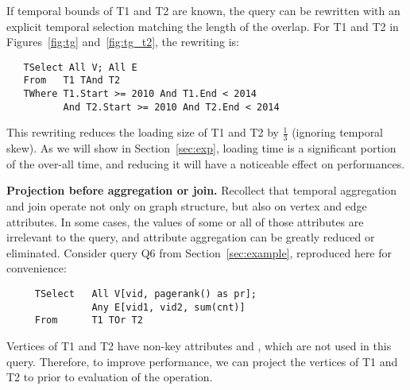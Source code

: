 If temporal bounds of T1 and T2 are known, the query can be rewritten
with an explicit temporal selection matching the length of the
overlap.  For T1 and T2 in Figures~\ref{fig:tg} and~\ref{fig:tg_t2},
the rewriting is:

\begin{small}
\begin{verbatim}
   TSelect All V; All E
   From   T1 TAnd T2
   TWhere T1.Start >= 2010 And T1.End < 2014 
          And T2.Start >= 2010 And T2.End < 2014
\end{verbatim}
\end{small}

This rewriting reduces the loading size of T1 and T2 by $\frac{1}{3}$
(ignoring temporal skew).  As we will show in Section~\ref{sec:exp},
loading time is a significant portion of the over-all time, and
reducing it will have a noticeable effect on performances.

{\bf Projection before aggregation or join.}  Recollect that temporal
aggregation and join operate not only on graph structure, but also on
vertex and edge attributes.  In some cases, the values of some or all
of those attributes are irrelevant to the query, and attribute
aggregation can be greatly reduced or eliminated.  Consider query Q6
from Section~\ref{sec:example}, reproduced here for convenience:

\begin{small}
\begin{verbatim}
     TSelect   All V[vid, pagerank() as pr]; 
               Any E[vid1, vid2, sum(cnt)]
     From      T1 TOr T2
\end{verbatim}
\end{small}

Vertices of T1 and T2 have non-key attributes  and
, which are not used in this query. Therefore, to
improve performance, we can project the vertices of T1 and T2 to
 prior to evaluation of the  operation.

